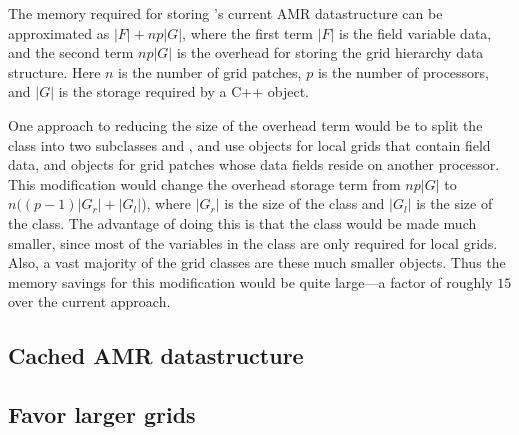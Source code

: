 \documentclass{article}
\begin{document}
\newcommand{\numgrids}{n}
\newcommand{\numprocs}{p}
\newcommand{\sizegrid}{|G|}
\newcommand{\sizegridlocal}{|G_l|}
\newcommand{\sizegridremote}{|G_r|}
\newcommand{\sizefield}{|F|}
\newcommand{\sizefields}{\sum_i^n |F_i|}

The memory required for storing \enzo's current AMR
datastructure can be approximated as $\sizefield + \numgrids \numprocs
\sizegrid$, where the first term $\sizefield$ is the field
variable data, and the second term $\numgrids \numprocs \sizegrid$ is
the overhead for storing the grid hierarchy data structure.  Here
$\numgrids$ is the number of grid patches, $\numprocs$
is the number of processors, and $\sizegrid$ is the storage required
by a C++  object.


One approach to reducing the size of the overhead term would be
to split the  class into two subclasses 
and , and use   objects for local grids
that contain field data, and  objects for grid
patches whose data fields reside on another processor.
This modification would change the overhead storage term from
$\numgrids \numprocs \sizegrid$ to $\numgrids ((\numprocs-1)
\sizegridremote + \sizegridlocal$), where $\sizegridremote$ is the
size of the  class and $\sizegridlocal$ is the size
of the  class.  The advantage of doing this is that the
 class would be made much smaller, since most of
the variables in the  class are only required for local
grids.  Also, a vast majority of the grid classes are these much
smaller  objects.  Thus the memory savings for this
modification would be quite large---a factor of roughly $15$ over the
current approach.

\subsection{Cached AMR datastructure}  \label{solution:amr-cache}
\subsection{Favor larger grids}\label{solution:amr-large-grids}
\end{document}

